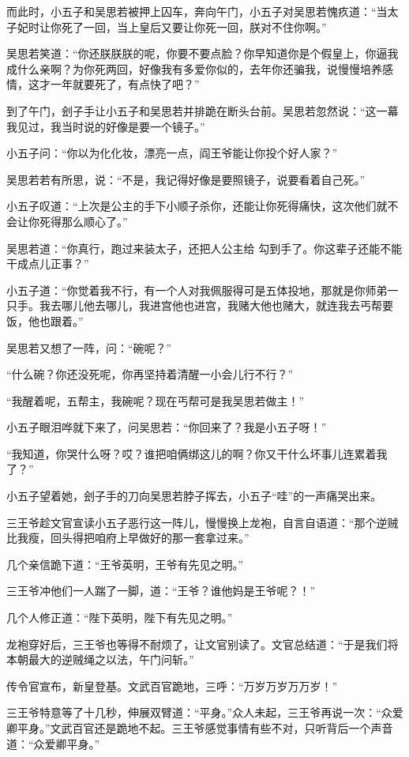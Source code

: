 而此时，小五子和吴思若被押上囚车，奔向午门，小五子对吴思若愧疚道：“当太子妃时让你死了一回，当上皇后又要让你死一回，朕对不住你啊。”

吴思若笑道：“你还朕朕朕的呢，你要不要点脸？你早知道你是个假皇上，你逼我成什么亲啊？为你死两回，好像我有多爱你似的，去年你还骗我，说慢慢培养感情，这才一年就要死了，有点快了吧？”

到了午门，刽子手让小五子和吴思若并排跪在断头台前。吴思若忽然说：“这一幕我见过，我当时说的好像是要一个镜子。”

小五子问：“你以为化化妆，漂亮一点，阎王爷能让你投个好人家？”

吴思若若有所思，说：“不是，我记得好像是要照镜子，说要看着自己死。”

小五子叹道：“上次是公主的手下小顺子杀你，还能让你死得痛快，这次他们就不会让你死得那么顺心了。”

吴思若道：“你真行，跑过来装太子，还把人公主给
勾到手了。你这辈子还能不能干成点儿正事？”

小五子道：“你觉着我不行，有一个人对我佩服得可是五体投地，那就是你师弟一只手。我去哪儿他去哪儿，我进宫他也进宫，我赌大他也赌大，就连我去丐帮要饭，他也跟着。”

吴思若又想了一阵，问：“碗呢？”

“什么碗？你还没死呢，你再坚持着清醒一小会儿行不行？”

“我醒着呢，五帮主，我碗呢？现在丐帮可是我吴思若做主！”

小五子眼泪哗就下来了，问吴思若：“你回来了？我是小五子呀！”

“我知道，你哭什么呀？哎？谁把咱俩绑这儿的啊？你又干什么坏事儿连累着我了？”

小五子望着她，刽子手的刀向吴思若脖子挥去，小五子“哇”的一声痛哭出来。
\newline

三王爷趁文官宣读小五子恶行这一阵儿，慢慢换上龙袍，自言自语道：“那个逆贼比我瘦，回头得把咱府上早做好的那一套拿过来。”

几个亲信跪下道：“王爷英明，王爷有先见之明。”

三王爷冲他们一人踹了一脚，道：“王爷？谁他妈是王爷呢？！”

几个人修正道：“陛下英明，陛下有先见之明。”

龙袍穿好后，三王爷也等得不耐烦了，让文官别读了。文官总结道：“于是我们将本朝最大的逆贼绳之以法，午门问斩。”

传令官宣布，新皇登基。文武百官跪地，三呼：“万岁万岁万万岁！”

三王爷特意等了十几秒，伸展双臂道：“平身。”众人未起，三王爷再说一次：“众爱卿平身。”文武百官还是跪地不起。三王爷感觉事情有些不对，只听背后一个声音道：“众爱卿平身。”

